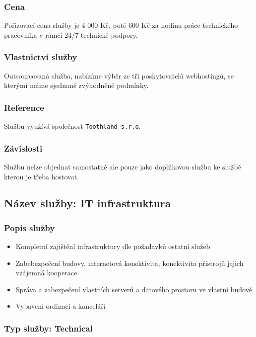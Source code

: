 \documentclass[11pt, a4paper, titlepage]{article}
\begin{document}
	\subsubsection*{Cena}
	Pořizovací cena služby je 4 000 Kč, poté 600 Kč za hodinu práce technického pracovníka v rámci 24/7 technické podpory.

	\subsubsection*{Vlastnictví služby}
	Outsourcovaná služba, nabízíme výběr ze tří poskytovatelů webhostingů, se kterými máme sjednané zvýhodněné podmínky.

	\subsubsection*{Reference}
	Službu využívá společnost \texttt{Toothland s.r.o}.

	\subsubsection*{Závislosti}
	Službu nelze objednat samostatně ale pouze jako doplňkovou službu ke službě kterou je třeba hostovat.

	\subsection*{Název služby: IT infrastruktura}

	\subsubsection*{Popis služby}
	\begin{itemize}
		\item Kompletní zajištění infrastruktury dle požadavků ostatní služeb
		\item Zabebezpečení budovy, internetová konektivita, konektivita přístrojů jejich vzájemná kooperace
		\item Správa a zabezpečení vlastních serverů a datového prostoru ve vlastní budově
		\item Vybavení ordinací a kanceláří
	\end{itemize}

	\subsubsection*{Typ služby: Technical}
\end{document}
